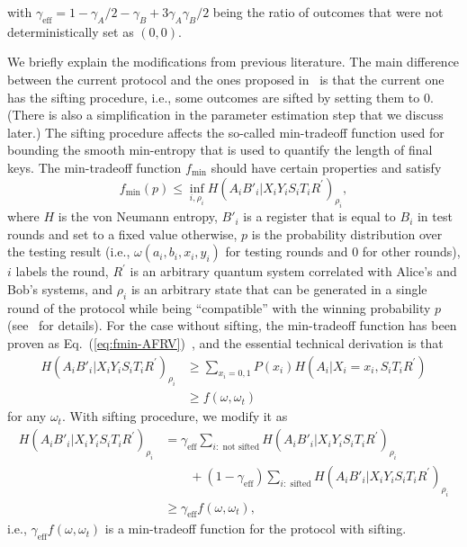 \documentclass[aps,reprint,showpacs,superscriptaddress]{revtex4-2}
\begin{document}
with $\gamma_{\mathrm{eff}}=1-\gamma_{A}/2-\gamma_{B}+3\gamma_{A}\gamma_{B}/2$
being the ratio of outcomes that were not deterministically set as $(0,0)$.

We briefly explain the modifications from previous literature.
The main difference between the current protocol and the ones proposed
in~\cite{arnon2018practical,TSB+22} is that the current one has the sifting procedure, i.e.,
some outcomes are sifted by setting them to $0$. (There is also a simplification in the parameter estimation step that we discuss later.) The sifting procedure affects
the so-called min-tradeoff function used for bounding the smooth min-entropy that is used to quantify the length of final keys. The min-tradeoff
function $f_{\min}$ should have certain properties and satisfy
\begin{equation}
f_{\min}\left(p\right)\leqslant\inf_{i,\rho_{i}}H\left(A_{i}B'_{i}|X_{i}Y_{i}S_{i}T_{i}R^{\prime}\right)_{\rho_{i}},
\end{equation}
where $H$ is the von Neumann entropy,
$B'_{i}$ is a register that is equal to $B_{i}$ in test rounds and set to a fixed value otherwise,
$p$ is the probability distribution
over the testing result (i.e., $\omega(a_{i},b_{i},x_{i},y_{i})$
for testing rounds and $0$ for other rounds), $i$ labels the round,
$R^{\prime}$ is an arbitrary quantum system correlated with Alice's
and Bob's systems, and $\rho_{i}$ is an arbitrary state that can be
generated in a single round of the protocol while being ``compatible'' with the winning probability $p$ (see~\cite{arnon2018practical,TSB+22} for details). For the case without sifting, the min-tradeoff function
has been proven as Eq.~(\ref{eq:fmin-AFRV})~\cite{arnon2018practical}, and the essential
technical derivation is that
\begin{align}
H\left(A_{i}B'_{i}|X_{i}Y_{i}S_{i}T_{i}R^{\prime}\right)_{\rho_{i}} & \geqslant\sum_{x_{i}=0,1}P\left(x_{i}\right)H\left(A_{i}|X_{i}=x_{i},S_{i}T_{i}R^{\prime}\right)\\
& \geqslant f\left(\omega,\omega_{t}\right)
\end{align}
for any $\omega_{t}$. With sifting procedure, we modify it as
\begin{align}
H\left(A_{i}B'_{i}|X_{i}Y_{i}S_{i}T_{i}R^{\prime}\right)_{\rho_{i}} & =\gamma_{\mathrm{eff}}\sum_{i:\text{ not sifted}}H\left(A_{i}B'_{i}|X_{i}Y_{i}S_{i}T_{i}R^{\prime}\right)_{\rho_{i}}\nonumber \\
& \qquad+\left(1-\gamma_{\mathrm{eff}}\right)\sum_{i:\text{ sifted}}H\left(A_{i}B'_{i}|X_{i}Y_{i}S_{i}T_{i}R^{\prime}\right)_{\rho_{i}}\\
& \geqslant\gamma_{\mathrm{eff}}f\left(\omega,\omega_{t}\right),
\end{align}
i.e., $\gamma_{\mathrm{eff}}f\left(\omega,\omega_{t}\right)$ is a
min-tradeoff function for the protocol with sifting.
\end{document}
